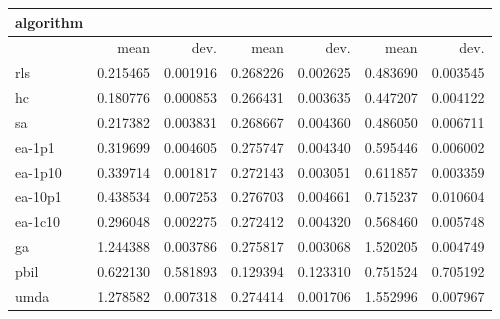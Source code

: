 \begin{tabular}{@{}l*{6}{>{{}}N{1}{2}}@{}}
\toprule
{algorithm} &  &  &  \\
\midrule
& {mean} & {dev.} & {mean} & {dev.} & {mean} & {dev.} \\
\midrule
rls & 0.215465 & 0.001916 & 0.268226 & 0.002625 & 0.483690 & 0.003545 \\
 hc & 0.180776 & 0.000853 & 0.266431 & 0.003635 & 0.447207 & 0.004122 \\
 sa & 0.217382 & 0.003831 & 0.268667 & 0.004360 & 0.486050 & 0.006711 \\
 ea-1p1 & 0.319699 & 0.004605 & 0.275747 & 0.004340 & 0.595446 & 0.006002 \\
 ea-1p10 & 0.339714 & 0.001817 & 0.272143 & 0.003051 & 0.611857 & 0.003359 \\
 ea-10p1 & 0.438534 & 0.007253 & 0.276703 & 0.004661 & 0.715237 & 0.010604 \\
 ea-1c10 & 0.296048 & 0.002275 & 0.272412 & 0.004320 & 0.568460 & 0.005748 \\
 ga & 1.244388 & 0.003786 & 0.275817 & 0.003068 & 1.520205 & 0.004749 \\
 pbil & 0.622130 & 0.581893 & 0.129394 & 0.123310 & 0.751524 & 0.705192 \\
 umda & 1.278582 & 0.007318 & 0.274414 & 0.001706 & 1.552996 & 0.007967 \\
 \bottomrule
\end{tabular}
